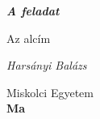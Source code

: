 \documentclass{book}
\begin{document}
\begin{titlepage}
\vspace{1cm}
\centering
\LARGE
\textit{\textbf{A feladat}}

\vspace{1 cm}
\Large
\textrm{Az alcím}

\vspace{5 cm}
\normalsize
\emph{Harsányi Balázs}

\vspace{200pt}
\footnotesize
Miskolci Egyetem
\\
\textbf{Ma}
\end{titlepage}
\end{document}
